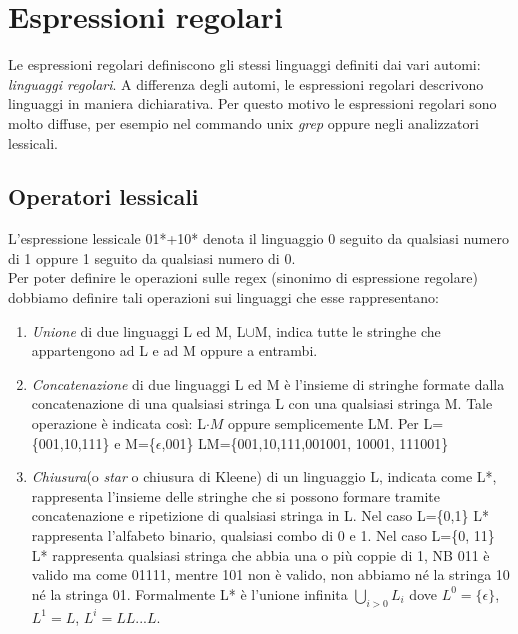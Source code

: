 \documentclass[12pt]{article}
\begin{document}
\section{Espressioni regolari}
Le espressioni regolari definiscono gli stessi linguaggi definiti dai vari automi: \emph{linguaggi regolari}. A differenza degli automi, le espressioni regolari descrivono linguaggi in maniera dichiarativa. Per questo motivo le espressioni regolari sono molto diffuse, per esempio nel commando unix \emph{grep} oppure negli analizzatori lessicali.
\subsection{Operatori lessicali}
L'espressione lessicale 01*+10* denota il linguaggio 0 seguito da qualsiasi numero di 1 oppure 1 seguito da qualsiasi numero di 0.
\\ Per poter definire le operazioni sulle regex (sinonimo di espressione regolare) dobbiamo definire tali operazioni sui linguaggi che esse rappresentano: 
\begin{enumerate}
  \item \emph{Unione} di due linguaggi L ed M, L$\cup$M, indica tutte le stringhe che appartengono ad L e ad M oppure a entrambi.
  \item \emph{Concatenazione} di due linguaggi L ed M è l'insieme di stringhe formate dalla concatenazione di una qualsiasi stringa L con una qualsiasi stringa M. Tale operazione è indicata così: L$\cdot M$ oppure semplicemente LM. 
     Per L=\{001,10,111\} e M=\{$\epsilon$,001\} 
     LM=\{001,10,111,001001, 10001, 111001\}
   \item \emph{Chiusura}(o \emph{star} o chiusura di Kleene) di un linguaggio L, indicata come L*, rappresenta l'insieme delle stringhe che si possono formare tramite concatenazione e ripetizione di qualsiasi stringa in L. Nel caso L=\{0,1\} L* rappresenta l'alfabeto binario, qualsiasi combo di 0 e 1. Nel caso L=\{0, 11\} L* rappresenta qualsiasi stringa che abbia una o più coppie di 1, NB 011 è valido ma come 01111, mentre 101 non è valido, non abbiamo né la stringa 10 né la stringa 01. Formalmente L* è l'unione infinita $\bigcup_{i>0}L_i$ dove $L^0=\{\epsilon\}$, $L^1=L$, $L^i=LL...L$.
\end{enumerate}

\newpage
\end{document}
